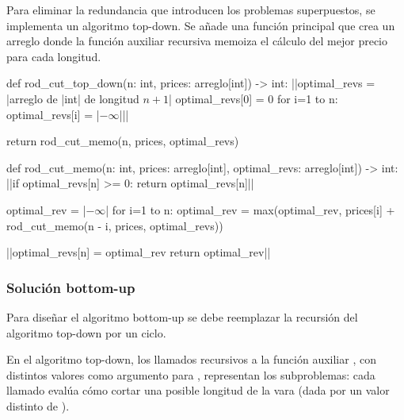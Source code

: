 Para eliminar la redundancia que introducen los problemas superpuestos, se implementa un algoritmo top-down. Se añade una función principal que crea un arreglo donde la función auxiliar recursiva memoiza el cálculo del mejor precio para cada longitud.
\begin{codeblock}
\begin{pseudocode}
def rod_cut_top_down(n: int, prices: arreglo[int]) -> int:
    ||optimal_revs = |\textrm{arreglo de }|int|\textrm{ de longitud \(n+1\)}|
    optimal_revs[0] = 0
    for i=1 to n:
        optimal_revs[i] = |\(-\infty\)|||

    return rod_cut_memo(n, prices, optimal_revs)

def rod_cut_memo(n: int, prices: arreglo[int], optimal_revs: arreglo[int]) -> int:
    ||if optimal_revs[n] >= 0:
        return optimal_revs[n]||

    optimal_rev = |\(-\infty\)|
    for i=1 to n:
        optimal_rev = max(optimal_rev, prices[i] + rod_cut_memo(n - i, prices, optimal_revs))

    ||optimal_revs[n] = optimal_rev
    return optimal_rev||
\end{pseudocode}
\begin{annotations}
\end{annotations}
\end{codeblock}

\subsubsection{Solución bottom-up}
\label{sec:corte_vara_bottom_up}

Para diseñar el algoritmo bottom-up se debe reemplazar la recursión del algoritmo top-down por un ciclo. 

En el algoritmo top-down, los llamados recursivos a la función auxiliar , con distintos valores como argumento para , representan los subproblemas: cada llamado evalúa cómo cortar una posible longitud de la vara (dada por un valor distinto de ).

